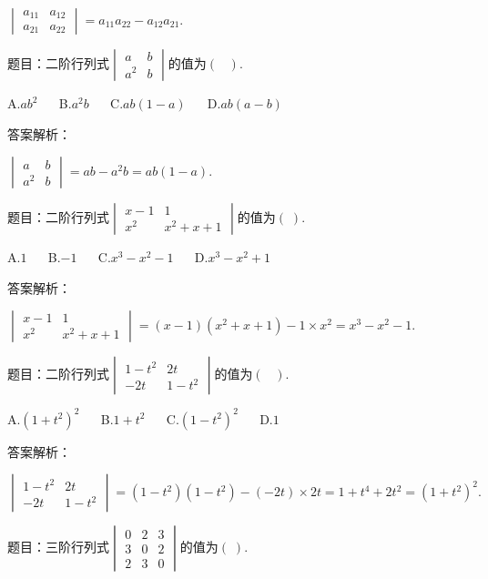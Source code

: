 $\begin{vmatrix}a_{11}&a_{12}\\a_{21}&a_{22}\end{vmatrix}=a_{11}a_{22}-a_{12}a_{21}.$



题目：$\mathrm{二阶行列式}\begin{vmatrix}a&b\\a^2&b\end{vmatrix}\mathrm{的值为}(\;\;\;).$

A.$ab^2$ $\quad$ B.$a^2b$ $\quad$ C.$ab(1-a)$ $\quad$ D.$ab(a-b)$

答案解析：

$\begin{vmatrix}a&b\\a^2&b\end{vmatrix}=ab-a^2b=ab(1-a).$



题目：$\mathrm{二阶行列式}\begin{vmatrix}x-1&1\\x^2&x^2+x+1\end{vmatrix}\mathrm{的值为}(\;).$

A.$1$ $\quad$ B.$-1$ $\quad$ C.$x^3-x^2-1$ $\quad$ D.$x^3-x^2+1$

答案解析：

$\begin{vmatrix}x-1&1\\x^2&x^2+x+1\end{vmatrix}=(x-1)(x^2+x+1)-1\times x^2=x^3-x^2-1.$



题目：$\mathrm{二阶行列式}\begin{vmatrix}1-t^2&2t\\-2t&1-t^2\end{vmatrix}\mathrm{的值为}(\;\;\;).$

A.$(1+t^2)^2$ $\quad$ B.$1+t^2$ $\quad$ C.$(1-t^2)^2$ $\quad$ D.$1$

答案解析：

$\begin{vmatrix}1-t^2&2t\\-2t&1-t^2\end{vmatrix}=(1-t^2)(1-t^2)-(-2t)\times2t=1+t^4+2t^2=(1+t^2)^2.$



题目：$\mathrm{三阶行列式}\begin{vmatrix}0&2&3\\3&0&2\\2&3&0\end{vmatrix}\mathrm{的值为}(\;).$

